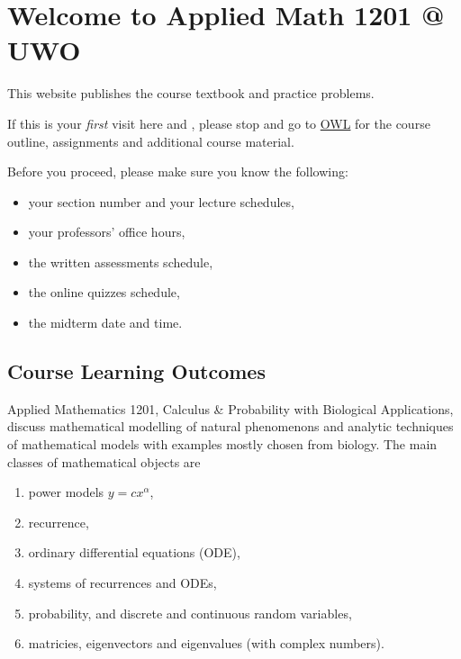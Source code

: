 \documentclass[../book.tex]{subfiles}
\begin{document}
\chapter*{Welcome to Applied Math 1201 @ UWO}\label{ch:welcome}

\begin{attentionbox}\label{warn:owl}
This website publishes the course textbook and practice problems.

If this is your \emph{first} visit here and , please stop and go to \href{https://owl.uwo.ca}{OWL} for the course outline, assignments and additional course material.
\end{attentionbox}
Before you proceed, please make sure you know the following:
\begin{itemize}
  \item your section number and your lecture schedules,
  \item your professors' office hours,
  \item the written assessments schedule,
  \item the online quizzes schedule,
  \item the midterm date and time.
\end{itemize}

\section*{Course Learning Outcomes}

Applied Mathematics 1201, Calculus \& Probability with Biological Applications, discuss mathematical modelling of natural phenomenons and analytic techniques of mathematical models with examples mostly chosen from biology.  The main classes of mathematical objects are
\begin{enumerate}
  \item power models \(y = c x^{\alpha}\),
  \item recurrence,
  \item ordinary differential equations (ODE),
  \item systems of recurrences and ODEs,
  \item probability, and discrete and continuous random variables,
  \item matricies, eigenvectors and eigenvalues (with complex numbers).
\end{enumerate}
\end{document}
